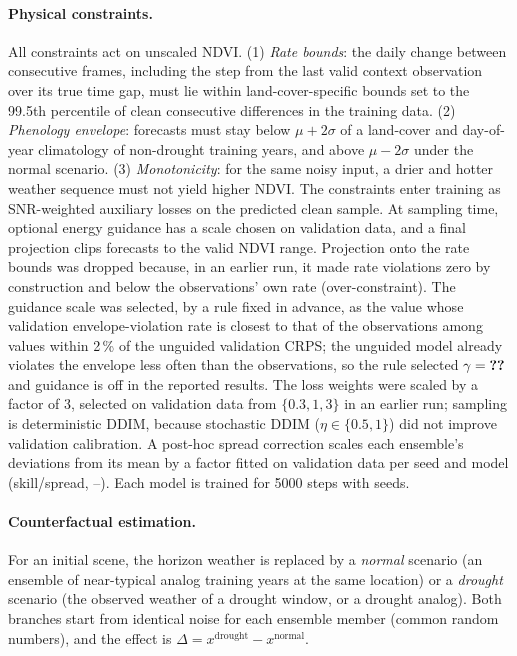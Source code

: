 \documentclass[10pt]{article}
\begin{document}
\paragraph{Physical constraints.} All constraints act on unscaled NDVI. (1) \emph{Rate bounds}: the daily change
between consecutive frames, including the step from the last valid context observation over its true time gap, must
lie within land-cover-specific bounds set to the 99.5th percentile of clean consecutive differences in the training
data. (2) \emph{Phenology envelope}: forecasts must stay below $\mu+2\sigma$ of a land-cover and day-of-year
climatology of non-drought training years, and above $\mu-2\sigma$ under the normal scenario. (3)
\emph{Monotonicity}: for the same noisy input, a drier and hotter weather sequence must not yield higher NDVI. The
constraints enter training as SNR-weighted auxiliary losses on the predicted clean sample. At sampling time, optional
energy guidance has a scale chosen on validation data, and a final projection clips forecasts to the valid NDVI range.
Projection onto the rate bounds was dropped because, in an earlier run, it made rate violations zero by construction
and below the observations' own rate (over-constraint). The guidance scale was selected, by a rule fixed in advance,
as the value whose validation envelope-violation rate is closest to that of the observations among values within
2\,\% of the unguided validation CRPS; the unguided model already violates the envelope less often than the
observations, so the rule selected $\gamma=\D{gamma}$ and guidance is off in the reported results. The loss weights
were scaled by a factor of 3, selected on validation data from $\{0.3, 1, 3\}$ in an earlier run; sampling is
deterministic DDIM, because stochastic DDIM ($\eta\in\{0.5,1\}$) did not improve validation calibration. A post-hoc
spread correction scales each ensemble's deviations from its mean by a factor fitted on validation data per seed and
model (skill/spread, --). Each model is trained for 5000 steps with  seeds.

\paragraph{Counterfactual estimation.} For an initial scene, the horizon weather is replaced by a \emph{normal}
scenario (an ensemble of near-typical analog training years at the same location) or a \emph{drought} scenario
(the observed weather of a drought window, or a drought analog). Both branches start from identical noise for each
ensemble member (common random numbers), and the effect is $\Delta = x^{\text{drought}} - x^{\text{normal}}$.
\end{document}
